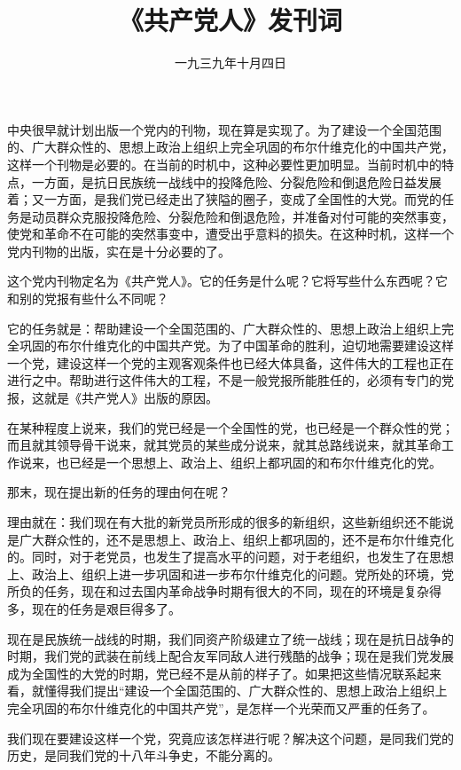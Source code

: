 
\title{《共产党人》发刊词}
\date{一九三九年十月四日}
\maketitle


中央很早就计划出版一个党内的刊物，现在算是实现了。为了建设一个全国范围的、广大群众性的、思想上政治上组织上完全巩固的布尔什维克化的中国共产党，这样一个刊物是必要的。在当前的时机中，这种必要性更加明显。当前时机中的特点，一方面，是抗日民族统一战线中的投降危险、分裂危险和倒退危险日益发展着；又一方面，是我们党已经走出了狭隘的圈子，变成了全国性的大党。而党的任务是动员群众克服投降危险、分裂危险和倒退危险，并准备对付可能的突然事变，使党和革命不在可能的突然事变中，遭受出乎意料的损失。在这种时机，这样一个党内刊物的出版，实在是十分必要的了。

这个党内刊物定名为《共产党人》。它的任务是什么呢？它将写些什么东西呢？它和别的党报有些什么不同呢？

它的任务就是：帮助建设一个全国范围的、广大群众性的、思想上政治上组织上完全巩固的布尔什维克化的中国共产党。为了中国革命的胜利，迫切地需要建设这样一个党，建设这样一个党的主观客观条件也已经大体具备，这件伟大的工程也正在进行之中。帮助进行这件伟大的工程，不是一般党报所能胜任的，必须有专门的党报，这就是《共产党人》出版的原因。

在某种程度上说来，我们的党已经是一个全国性的党，也已经是一个群众性的党；而且就其领导骨干说来，就其党员的某些成分说来，就其总路线说来，就其革命工作说来，也已经是一个思想上、政治上、组织上都巩固的和布尔什维克化的党。

那末，现在提出新的任务的理由何在呢？

理由就在：我们现在有大批的新党员所形成的很多的新组织，这些新组织还不能说是广大群众性的，还不是思想上、政治上、组织上都巩固的，还不是布尔什维克化的。同时，对于老党员，也发生了提高水平的问题，对于老组织，也发生了在思想上、政治上、组织上进一步巩固和进一步布尔什维克化的问题。党所处的环境，党所负的任务，现在和过去国内革命战争时期有很大的不同，现在的环境是复杂得多，现在的任务是艰巨得多了。

现在是民族统一战线的时期，我们同资产阶级建立了统一战线；现在是抗日战争的时期，我们党的武装在前线上配合友军同敌人进行残酷的战争；现在是我们党发展成为全国性的大党的时期，党已经不是从前的样子了。如果把这些情况联系起来看，就懂得我们提出“建设一个全国范围的、广大群众性的、思想上政治上组织上完全巩固的布尔什维克化的中国共产党”，是怎样一个光荣而又严重的任务了。

我们现在要建设这样一个党，究竟应该怎样进行呢？解决这个问题，是同我们党的历史，是同我们党的十八年斗争史，不能分离的。

